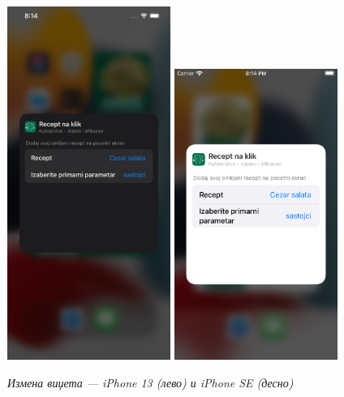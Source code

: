 \documentclass[12pt,oneside]{memoir}
\begin{document}
\begin{figure} [H]
    \centering
    \captionsetup{justification=centering}
    \includegraphics[width=0.475\textwidth]{images/simulators/view images/dark - change widget.png}
    \hfill
    \includegraphics[width=0.475\textwidth]{images/simulators/view images/light - change widget.png} 
    \caption{\textit{Измена виџета --- iPhone 13 (лево) и iPhone SE (десно)}}
    \label{slika:измена_виџета_1}
\end{figure}
\end{document}
